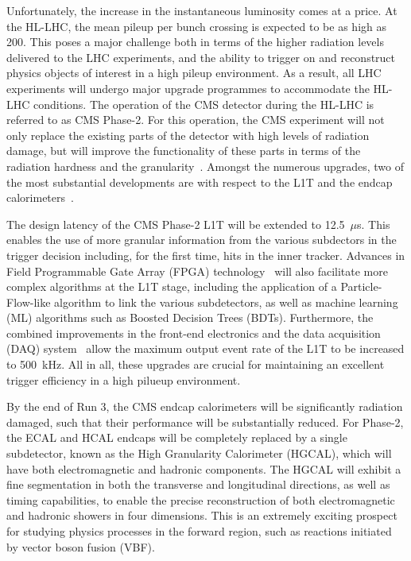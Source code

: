 Unfortunately, the increase in the instantaneous luminosity comes at a price. At the HL-LHC, the mean pileup per bunch crossing is expected to be as high as 200. This poses a major challenge both in terms of the higher radiation levels delivered to the LHC experiments, and the ability to trigger on and reconstruct physics objects of interest in a high pileup environment. As a result, all LHC experiments will undergo major upgrade programmes to accommodate the HL-LHC conditions. The operation of the CMS detector during the HL-LHC is referred to as CMS Phase-2. For this operation, the CMS experiment will not only replace the existing parts of the detector with high levels of radiation damage, but will improve the functionality of these parts in terms of the radiation hardness and the granularity~\cite{Contardo:2020886}. Amongst the numerous upgrades, two of the most substantial developments are with respect to the L1T and the endcap calorimeters~\cite{CERN-LHCC-2017-023,CERN-LHCC-2020-004}.

The design latency of the CMS Phase-2 L1T will be extended to 12.5~$\mu$s. This enables the use of more granular information from the various subdectors in the trigger decision including, for the first time, hits in the inner tracker. Advances in Field Programmable Gate Array (FPGA) technology~\cite{Duarte_2018}  will also facilitate more complex algorithms at the L1T stage, including the application of a Particle-Flow-like algorithm to link the various subdetectors, as well as machine learning (ML) algorithms such as Boosted Decision Trees (BDTs). Furthermore, the combined improvements in the front-end electronics and the data acquisition (DAQ) system~\cite{CERN-LHCC-2017-014} allow the maximum output event rate of the L1T to be increased to 500~kHz. All in all, these upgrades are crucial for maintaining an excellent trigger efficiency in a high pilueup environment.

By the end of Run 3, the CMS endcap calorimeters will be significantly radiation damaged, such that their performance will be substantially reduced. For Phase-2, the ECAL and HCAL endcaps will be completely replaced by a single subdetector, known as the High Granularity Calorimeter (HGCAL), which will have both electromagnetic and hadronic components. The HGCAL will exhibit a fine segmentation in both the transverse and longitudinal directions, as well as timing capabilities, to enable the precise reconstruction of both electromagnetic and hadronic showers in four dimensions. This is an extremely exciting prospect for studying physics processes in the forward region, such as reactions initiated by vector boson fusion (VBF).

